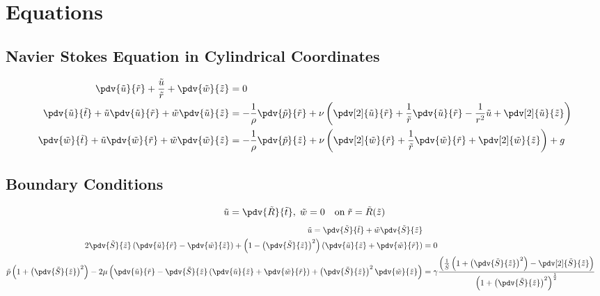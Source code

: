 \documentclass[12pt]{article}
\begin{document}
\appendix
\section{Equations}
\subsection{Navier Stokes Equation in Cylindrical Coordinates \label{eqs}}

\begin{align}
\pdv{\tilde u}{\tilde r}+\frac{\tilde u}{\tilde r}+\pdv{\tilde w}{\tilde z}&=0\\
\pdv{\tilde u}{\tilde t}+\tilde u\pdv{\tilde u}{\tilde r}+\tilde w\pdv{\tilde u}{\tilde z}&=-\frac{1}{\rho}\pdv{\tilde p}{\tilde r}+\nu\left(\pdv[2]{\tilde u}{\tilde r}+\frac{1}{\tilde r}\pdv{\tilde u}{\tilde r}-\frac{1}{r^2}\tilde u+\pdv[2]{\tilde u}{\tilde z}\right)\\
\pdv{\tilde w}{\tilde t}+\tilde u\pdv{\tilde w}{\tilde r}+\tilde w\pdv{\tilde w}{\tilde z}&=-\frac{1}{\rho}\pdv{\tilde p}{\tilde z}+\nu\left(\pdv[2]{\tilde w}{\tilde r}+\frac{1}{\tilde r}\pdv{\tilde w}{\tilde r}+\pdv[2]{\tilde w}{\tilde z}\right) + g 
\end{align}
\subsection{Boundary Conditions}
\begin{align}
\tilde u=\pdv{\tilde R}{\tilde t},\;\tilde  w=0\quad\mathrm{on}\; \tilde r=\tilde R(\tilde z) 
\end{align}
\begin{align}
\tilde   u=\pdv{\tilde S}{\tilde t}+\tilde w\pdv{\tilde S}{\tilde z} \\
2\pdv{\tilde S}{\tilde z}\left(\pdv{\tilde u}{\tilde r}-\pdv{\tilde w}{\tilde z}\right)+\left(1-\left(\pdv{\tilde S}{\tilde z}\right)^2\right)\left(\pdv{\tilde u}{\tilde z}+\pdv{\tilde w}{\tilde r}\right)&=0\label{tangstress}\\
\tilde p\left(1+\left(\pdv{\tilde S}{\tilde z}\right)^2\right)-2\mu\left( \pdv{\tilde u}{\tilde r}-\pdv{\tilde S}{\tilde z}\left(\pdv{\tilde u}{\tilde z}+\pdv{\tilde w}{\tilde r}\right)+\left(\pdv{\tilde S}{\tilde z}\right)^2\pdv{\tilde w}{\tilde z}\right)&=\gamma\frac{\left(\frac{1}{\tilde S}\left(1+\left(\pdv{\tilde S}{\tilde z}\right)^2\right)-\pdv[2]{\tilde S}{\tilde z}\right)}{\left(1+\left(\pdv{\tilde S}{\tilde z}\right)^2\right)^{\frac{1}{2}}}\label{normstress}
\end{align}
\end{document}

